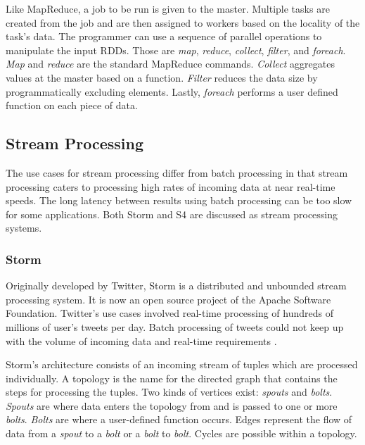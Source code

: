 \documentclass[12pt]{article}
\begin{document}
Like MapReduce, a job to be run is given to the master. Multiple tasks are created from the job and are then assigned to workers based on the locality of the task's data. The programmer can use a sequence of parallel operations to manipulate the input RDDs. Those are \emph{map}, \emph{reduce}, \emph{collect}, \emph{filter}, and \emph{foreach}. \emph{Map} and \emph{reduce} are the standard MapReduce commands. \emph{Collect} aggregates values at the master based on a function. \emph{Filter} reduces the data size by programmatically excluding elements. Lastly, \emph{foreach} performs a user defined function on each piece of data.





\subsection{Stream Processing} \label{sub:stream}


The use cases for stream processing differ from batch processing in that stream processing caters to processing high rates of incoming data at near real-time speeds. The long latency between results using batch processing can be too slow for some applications. Both Storm \cite{toshniwal2014storm} and S4 \cite{neumeyer2010s4} are discussed as stream processing systems.

\subsubsection{Storm}

Originally developed by Twitter, Storm \cite{toshniwal2014storm} is a distributed and unbounded stream processing system. It is now an open source project of the Apache Software Foundation. Twitter's use cases involved real-time processing of hundreds of millions of user's tweets per day. Batch processing of tweets could not keep up with the volume of incoming data and real-time requirements \cite{toshniwal2014storm}.

Storm's architecture consists of an incoming stream of tuples which are processed individually. A topology is the name for the directed graph that contains the steps for processing the tuples. Two kinds of vertices exist: \textit{spouts} and \textit{bolts}. \textit{Spouts} are where data enters the topology from and is passed to one or more \textit{bolts}. \textit{Bolts} are where a user-defined function occurs. Edges represent the flow of data from a \textit{spout} to a \textit{bolt} or a \textit{bolt} to \textit{bolt}. Cycles are possible within a topology.
\end{document}
